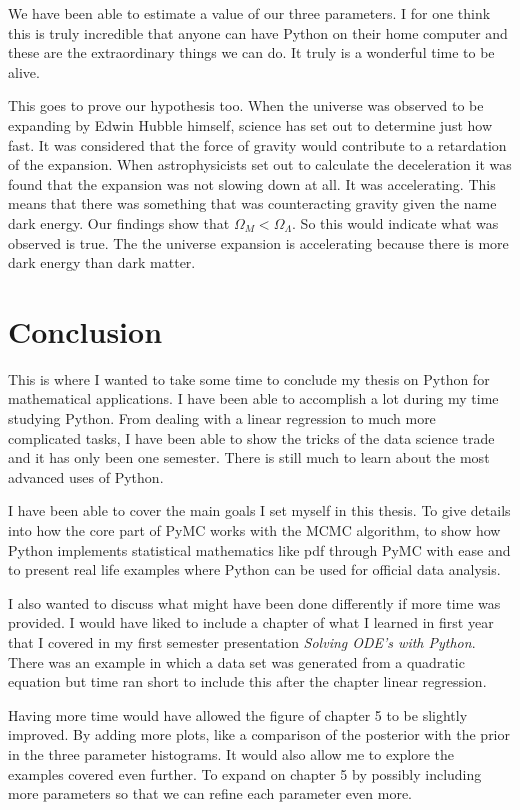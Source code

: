 \documentclass[12pt,twoside]{report}   %
\begin{document}
We have been able to estimate a value of our three parameters. I for one think this is truly incredible that anyone can have Python on their home computer and these are the extraordinary things we can do. It truly is a wonderful time to be alive.

This goes to prove our hypothesis too. When the universe was observed to be expanding by Edwin Hubble himself, science has set out to determine just how fast. It was considered that the force of gravity would contribute to a retardation of the expansion. When astrophysicists set out to calculate the deceleration it was found that the expansion was not slowing down at all. It was accelerating. This means that there was something that was counteracting gravity given the name dark energy. Our findings show that $\Omega_M < \Omega_\Lambda$. So this would indicate what was observed is true. The the universe expansion is accelerating because there is more dark energy than dark matter.

\chapter{Conclusion}

This is where I wanted to take some time to conclude my thesis on Python for mathematical applications. I have been able to accomplish a lot during my time studying Python. From dealing with a linear regression to much more complicated tasks, I have been able to show the tricks of the data science trade and it has only been one semester. There is still much to learn about the most advanced uses of Python.

I have been able to cover the main goals I set myself in this thesis. To give details into how the core part of PyMC works with the MCMC algorithm, to show how Python implements statistical mathematics like pdf through PyMC with ease and to present real life examples where Python can be used for official data analysis.

I also wanted to discuss what might have been done differently if more time was provided. I would have liked to include a chapter of what I learned in first year that I covered in my first semester presentation \textit{Solving ODE's with Python}. There was an example in which a data set was generated from a quadratic equation but time ran short to include this after the chapter linear regression.

Having more time would have allowed the figure of chapter 5 to be slightly improved. By adding more plots, like a comparison of the posterior with the prior in the three parameter histograms. It would also allow me to explore the examples covered even further. To expand on chapter 5 by possibly including more parameters so that we can refine each parameter even more. 
\end{document}
